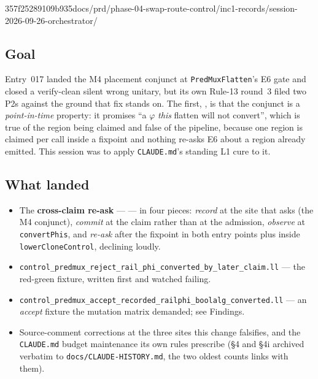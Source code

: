 %
  {357f2528}{9109b935}{docs/prd/phase-04-swap-route-control/inc1-records/session-2026-09-26-orchestrator/}

\subsection*{Goal}
Entry~017 landed the M4 placement conjunct at \texttt{PredMuxFlatten}'s E6 gate and closed a
verify-clean silent wrong unitary, but its own Rule-13 round~3 filed two P2s against the ground
that fix stands on. The first, , is that the conjunct is a
\emph{point-in-time} property: it promises ``a \(\varphi\) \emph{this} flatten will not
convert'', which is true of the region being claimed and false of the pipeline, because one
region is claimed per call inside a fixpoint and nothing re-asks E6 about a region already
emitted. This session was to apply \texttt{CLAUDE.md}'s standing L1 cure to it.

\subsection*{What landed}
\begin{itemize}
  \item The \textbf{cross-claim re-ask} ---  --- in four pieces:
        \emph{record} at the site that asks (the M4 conjunct), \emph{commit} at the claim rather
        than at the admission, \emph{observe} at \texttt{convertPhis}, and \emph{re-ask} after
        the fixpoint in both entry points plus inside \texttt{lowerCloneControl}, declining
        loudly.
  \item \texttt{control\_predmux\_reject\_rail\_phi\_converted\_by\_later\_claim.ll} --- the
        red-green fixture, written first and watched failing.
  \item \texttt{control\_predmux\_accept\_recorded\_railphi\_boolalg\_converted.ll} --- an
        \emph{accept} fixture the mutation matrix demanded; see Findings.
  \item Source-comment corrections at the three sites this change falsifies, and the
        \texttt{CLAUDE.md} budget maintenance its own rules prescribe (\S4 and \S4i archived
        verbatim to \texttt{docs/CLAUDE-HISTORY.md}, the two oldest counts links with them).
\end{itemize}

